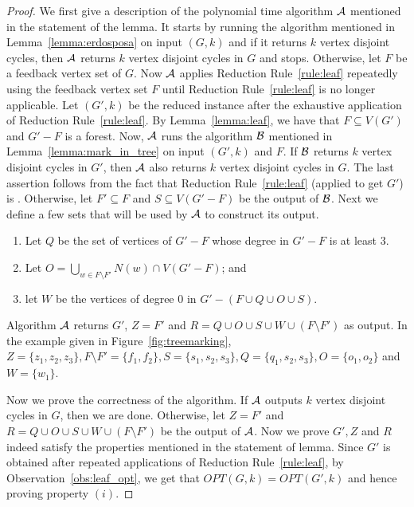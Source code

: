 \begin{proof}
We first give a description of the polynomial time algorithm ${\cal A}$ mentioned in the statement of the lemma. 
It starts by running  the algorithm mentioned in Lemma~\ref{lemma:erdosposa} on input $(G,k)$ and if it returns $k$ vertex disjoint cycles,  then ${\cal A}$ returns 
$k$ vertex disjoint cycles in $G$ 
and stops. Otherwise, let $F$ be a 
feedback vertex set of $G$. 
Now  ${\cal A}$ applies Reduction Rule~\ref{rule:leaf} repeatedly using the feedback vertex set $F$ until 
Reduction Rule~\ref{rule:leaf} is no longer applicable. Let $(G',k)$ be the reduced instance after the exhaustive application of 
Reduction Rule~\ref{rule:leaf}. By Lemma~\ref{lemma:leaf}, we have that $F\subseteq V(G')$ and $G'-F$ is a forest. 
Now,  ${\cal A}$ runs the algorithm ${\cal B}$ mentioned in Lemma~\ref{lemma:mark_in_tree} on input $(G',k)$ and $F$. If ${\cal B}$ 
returns $k$ vertex disjoint cycles in $G'$, then ${\cal A}$ also returns $k$ vertex disjoint cycles in $G$. The last assertion follows from the fact that  Reduction Rule~\ref{rule:leaf} (applied to get $G'$) is \onesafe. 
Otherwise, let $F'\subseteq F$ and $S\subseteq V(G'-F)$ be the output of ${\cal B}$. Next we define a 
few sets that will be used by $\cal A$ to construct its output.
\begin{enumerate}
\setlength{\itemsep}{-2pt}
\item Let $Q$ be the set 
of vertices of $G'-F$ whose  degree in $G'-F$ is at least $3$. 
\item Let $O=\bigcup_{w\in F\setminus F'} N(w)\cap V(G'-F)$; and 
\item let $W$ be the vertices of degree $0$ in $G'-(F\cup Q\cup O \cup S)$. 
\end{enumerate}
Algorithm ${\cal A}$ returns $G'$, $Z=F'$ and 
$R=Q\cup O \cup S\cup W \cup (F\setminus F')$ as output. In the example given in Figure~\ref{fig:treemarking}, $Z=\{z_1,z_2,z_3\}, F\setminus F'=\{f_1,f_2\}, S=\{s_1,s_2,s_3\}, Q=\{q_1,s_2,s_3\}, O=\{o_1,o_2\}$ and $W=\{w_1\}$.

Now we prove the correctness of the algorithm. If ${\cal A}$ outputs $k$ vertex disjoint  cycles in $G$, then we are done. Otherwise, let $Z=F'$ and $R=Q\cup O \cup S\cup W \cup (F\setminus F')$ be the output of ${\cal A}$. 
Now we prove $G', Z$ and $R$  indeed satisfy the properties mentioned in the statement of lemma.
Since $G'$ is obtained after repeated applications of Reduction Rule~\ref{rule:leaf}, by Observation~\ref{obs:leaf_opt}, we get 
that $OPT(G,k)=OPT(G',k)$ and hence proving property $(i)$.  



\end{proof}
